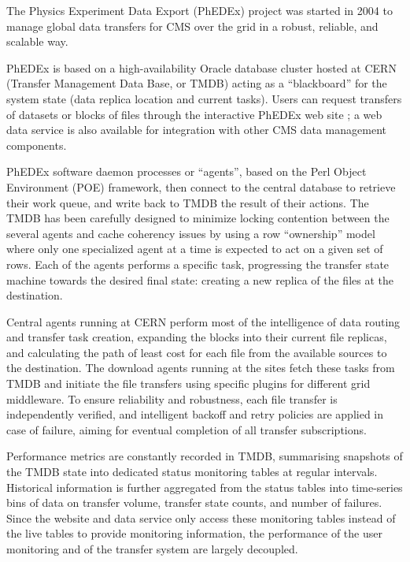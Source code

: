 The Physics Experiment Data Export (PhEDEx) \cite{PhEDEx} project was started in 2004 to manage global data transfers for CMS over the grid in a robust, reliable, and scalable way.

PhEDEx is based on a high-availability Oracle database cluster hosted at CERN (Transfer Management Data Base, or TMDB) acting as a ``blackboard'' for the system state (data replica location and current tasks). Users can request transfers of datasets or blocks of files through the interactive PhEDEx web site \cite{phedexweb}; a web data service \cite{phedexdatasvc} is also available for integration with other CMS data management components.

PhEDEx software daemon processes or ``agents'', based on the Perl Object Environment (POE) \cite{poe} framework, then  connect to the central database to retrieve their work queue, and write back to TMDB the result of their actions.
The TMDB has been carefully designed to minimize locking contention between the several agents and cache
coherency issues by using a row ``ownership'' model where only one specialized agent at a time is expected to act on a given set of rows.
Each of the agents performs a specific task, progressing the transfer state machine towards the desired final state: creating a new replica of the files at the destination.

Central agents running at CERN perform most of the intelligence of data routing and transfer task creation, expanding the blocks into their current file replicas, and calculating the path of least cost for each file from the available sources to the destination.
The download agents running at the sites fetch these tasks from TMDB and initiate the file transfers using specific plugins
for different grid middleware. To ensure reliability and robustness, each file transfer is independently verified, and intelligent backoff and retry policies are applied in case of failure, aiming for eventual completion of all transfer subscriptions.

Performance metrics are constantly recorded in TMDB, summarising snapshots of the TMDB state into dedicated status monitoring tables at regular intervals. Historical information is further aggregated from the status tables into time-series bins of data on transfer volume, transfer state counts, and number of failures. Since the website and data service only access these monitoring tables instead of the live tables to provide monitoring information, the performance of the user monitoring and of the transfer system are largely decoupled.

